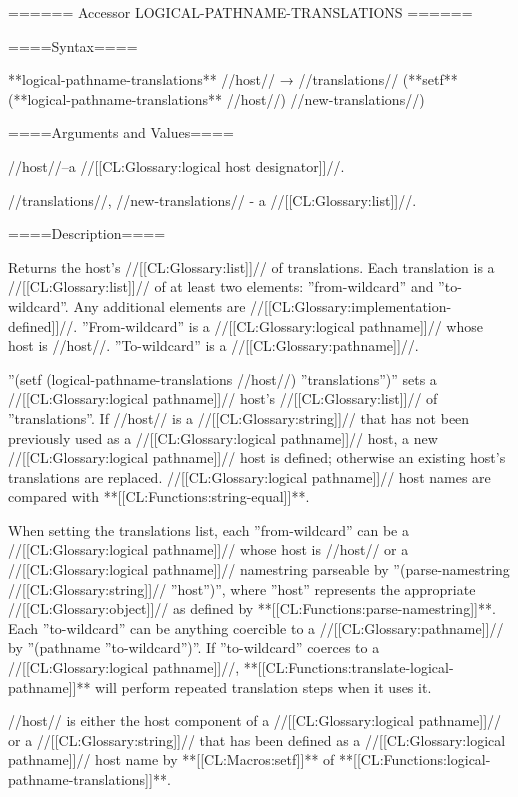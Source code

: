 ====== Accessor LOGICAL-PATHNAME-TRANSLATIONS ======

====Syntax====

**logical-pathname-translations** //host// → //translations// (**setf** (**logical-pathname-translations** //host//) //new-translations//)

====Arguments and Values====

//host//--a //[[CL:Glossary:logical host designator]]//.

//translations//, //new-translations// - a //[[CL:Glossary:list]]//.

====Description====

Returns the host's //[[CL:Glossary:list]]// of translations. Each translation is a //[[CL:Glossary:list]]// of at least two elements: ''from-wildcard'' and ''to-wildcard''. Any additional elements are //[[CL:Glossary:implementation-defined]]//. ''From-wildcard'' is a //[[CL:Glossary:logical pathname]]// whose host is //host//. ''To-wildcard'' is a //[[CL:Glossary:pathname]]//. 

''(setf (logical-pathname-translations //host//) ''translations'')'' sets a //[[CL:Glossary:logical pathname]]// host's //[[CL:Glossary:list]]// of ''translations''. If //host// is a //[[CL:Glossary:string]]// that has not been previously used as a //[[CL:Glossary:logical pathname]]// host, a new //[[CL:Glossary:logical pathname]]// host is defined; otherwise an existing host's translations are replaced. //[[CL:Glossary:logical pathname]]// host names are compared with **[[CL:Functions:string-equal]]**.

When setting the translations list, each ''from-wildcard'' can be a //[[CL:Glossary:logical pathname]]// whose host is //host// or a //[[CL:Glossary:logical pathname]]// namestring parseable by ''(parse-namestring //[[CL:Glossary:string]]// ''host'')'', where ''host'' represents the appropriate //[[CL:Glossary:object]]// as defined by **[[CL:Functions:parse-namestring]]**. Each ''to-wildcard'' can be anything coercible to a //[[CL:Glossary:pathname]]// by ''(pathname ''to-wildcard'')''. If ''to-wildcard'' coerces to a //[[CL:Glossary:logical pathname]]//, **[[CL:Functions:translate-logical-pathname]]** will perform repeated translation steps when it uses it.

//host// is either the host component of a //[[CL:Glossary:logical pathname]]// or a //[[CL:Glossary:string]]// that has been defined as a //[[CL:Glossary:logical pathname]]// host name by **[[CL:Macros:setf]]** of **[[CL:Functions:logical-pathname-translations]]**.

